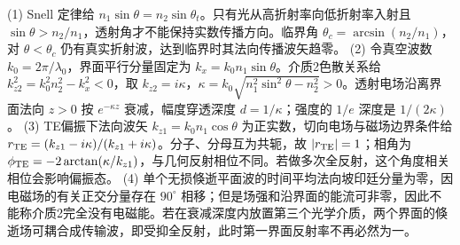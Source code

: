 (1) Snell 定律给 \(n_1\sin\theta=n_2\sin\theta_t\)。只有光从高折射率向低折射率入射且 \(\sin\theta>n_2/n_1\)，透射角才不能保持实数传播方向。临界角 \(\theta_c=\arcsin(n_2/n_1)\)，对 \(\theta<\theta_c\) 仍有真实折射波，达到临界时其法向传播波矢趋零。
(2) 令真空波数 \(k_0=2\pi/\lambda_0\)，界面平行分量固定为 \(k_x=k_0n_1\sin\theta\)。介质2色散关系给 \(k_{z2}^2=k_0^2n_2^2-k_x^2<0\)，取 \(k_{z2}=i\kappa\)，\(\kappa=k_0\sqrt{n_1^2\sin^2\theta-n_2^2}>0\)。透射电场沿离界面法向 \(z>0\) 按 \(e^{-\kappa z}\) 衰减，幅度穿透深度 \(d=1/\kappa\)；强度的 \(1/e\) 深度是 \(1/(2\kappa)\)。
(3) TE偏振下法向波矢 \(k_{z1}=k_0n_1\cos\theta\) 为正实数，切向电场与磁场边界条件给 \(r_{\rm TE}=(k_{z1}-i\kappa)/(k_{z1}+i\kappa)\)。分子、分母互为共轭，故 \(|r_{\rm TE}|=1\)；相角为 \(\phi_{\rm TE}=-2\arctan(\kappa/k_{z1})\)，与几何反射相位不同。若做多次全反射，这个角度相关相位会影响偏振态。
(4) 单个无损倏逝平面波的时间平均法向坡印廷分量为零，因电磁场的有关正交分量存在 \(90^\circ\) 相移；但是场强和沿界面的能流可非零，因此不能称介质2完全没有电磁能。若在衰减深度内放置第三个光学介质，两个界面的倏逝场可耦合成传输波，即受抑全反射，此时第一界面反射率不再必然为一。
